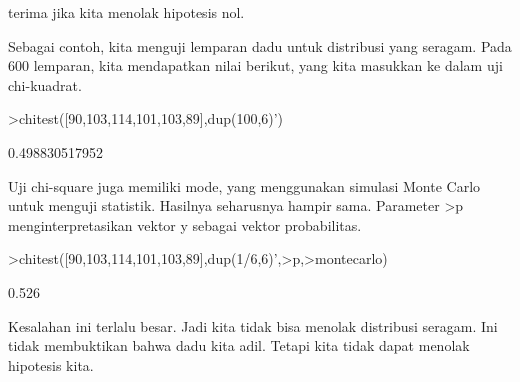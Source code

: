 \documentclass[a4paper,10pt]{article}
\begin{document}
\begin{eulernotebook}
\begin{eulercomment}
\begin{eulercomment}
\begin{eulercomment}
\begin{eulercomment}
\begin{eulercomment}
\begin{eulercomment}
\begin{eulercomment}
\begin{eulercomment}
\begin{eulercomment}
\begin{eulercomment}
\begin{eulercomment}
\begin{eulercomment}
\begin{eulercomment}
\begin{eulercomment}
\begin{eulercomment}
\begin{eulercomment}
\begin{eulercomment}
\begin{eulercomment}
\begin{eulercomment}
\begin{eulercomment}
\begin{eulercomment}
\begin{eulercomment}
\begin{eulercomment}
\begin{eulercomment}
\begin{eulercomment}
\begin{eulercomment}
\begin{eulercomment}
\begin{eulercomment}
\begin{eulercomment}
\begin{eulercomment}
\begin{eulercomment}
\begin{eulercomment}
\begin{eulercomment}
\begin{eulercomment}
\begin{eulercomment}
\begin{eulercomment}
\begin{eulercomment}
\begin{eulercomment}
\begin{eulercomment}
\begin{eulercomment}
\begin{eulercomment}
\begin{eulercomment}
\begin{eulercomment}
\begin{eulercomment}
\begin{eulercomment}
terima jika kita menolak hipotesis nol.

Sebagai contoh, kita menguji lemparan dadu untuk distribusi yang
seragam. Pada 600 lemparan, kita mendapatkan nilai berikut, yang kita
masukkan ke dalam uji chi-kuadrat.
\end{eulercomment}
\begin{eulerprompt}
>chitest([90,103,114,101,103,89],dup(100,6)')
\end{eulerprompt}
\begin{euleroutput}
  0.498830517952
\end{euleroutput}
\begin{eulercomment}
Uji chi-square juga memiliki mode, yang menggunakan simulasi Monte
Carlo untuk menguji statistik. Hasilnya seharusnya hampir sama.
Parameter \textgreater{}p menginterpretasikan vektor y sebagai vektor probabilitas.
\end{eulercomment}
\begin{eulerprompt}
>chitest([90,103,114,101,103,89],dup(1/6,6)',>p,>montecarlo)
\end{eulerprompt}
\begin{euleroutput}
  0.526
\end{euleroutput}
\begin{eulercomment}
Kesalahan ini terlalu besar. Jadi kita tidak bisa menolak distribusi
seragam. Ini tidak membuktikan bahwa dadu kita adil. Tetapi kita tidak
dapat menolak hipotesis kita.


\end{eulercomment}
\end{eulercomment}
\end{eulercomment}
\end{eulercomment}
\end{eulercomment}
\end{eulercomment}
\end{eulercomment}
\end{eulercomment}
\end{eulercomment}
\end{eulercomment}
\end{eulercomment}
\end{eulercomment}
\end{eulercomment}
\end{eulercomment}
\end{eulercomment}
\end{eulercomment}
\end{eulercomment}
\end{eulercomment}
\end{eulercomment}
\end{eulercomment}
\end{eulercomment}
\end{eulercomment}
\end{eulercomment}
\end{eulercomment}
\end{eulercomment}
\end{eulercomment}
\end{eulercomment}
\end{eulercomment}
\end{eulercomment}
\end{eulercomment}
\end{eulercomment}
\end{eulercomment}
\end{eulercomment}
\end{eulercomment}
\end{eulercomment}
\end{eulercomment}
\end{eulercomment}
\end{eulercomment}
\end{eulercomment}
\end{eulercomment}
\end{eulercomment}
\end{eulercomment}
\end{eulercomment}
\end{eulercomment}
\end{eulercomment}
\end{eulernotebook}
\end{document}
